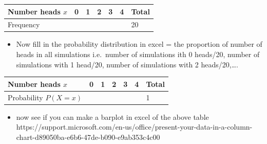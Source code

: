 \documentclass[
  10pt,
  letterpaper,
  DIV=11,
  numbers=noendperiod]{scrartcl}
\providecommand{\tightlist}{%
  \setlength{\itemsep}{0pt}\setlength{\parskip}{0pt}}\usepackage{longtable,booktabs,array}
\begin{document}
\begin{longtable}[]{@{}lllllll@{}}
\toprule\noalign{}
Number heads \(x\) & 0 & 1 & 2 & 3 & 4 & Total \\
\midrule\noalign{}
\endhead
\bottomrule\noalign{}
\endlastfoot
Frequency & & & & & & 20 \\
\end{longtable}

\begin{itemize}
\tightlist
\item
  Now fill in the probability distribution in excel = the proportion of
  number of heads in all simulations i.e.~number of simulations ith 0
  heads/20, number of simulations with 1 head/20, number of simulations
  with 2 heads/20,\ldots.
\end{itemize}

\begin{longtable}[]{@{}lllllll@{}}
\toprule\noalign{}
Number heads \(x\) & 0 & 1 & 2 & 3 & 4 & Total \\
\midrule\noalign{}
\endhead
\bottomrule\noalign{}
\endlastfoot
Probability \(P(X=x)\) & & & & & & 1 \\
\end{longtable}

\begin{itemize}
\tightlist
\item
  now see if you can make a barplot in excel of the above table
  https://support.microsoft.com/en-us/office/present-your-data-in-a-column-chart-d89050ba-e6b6-47de-b090-e9ab353c4c00
\end{itemize}
\end{document}

